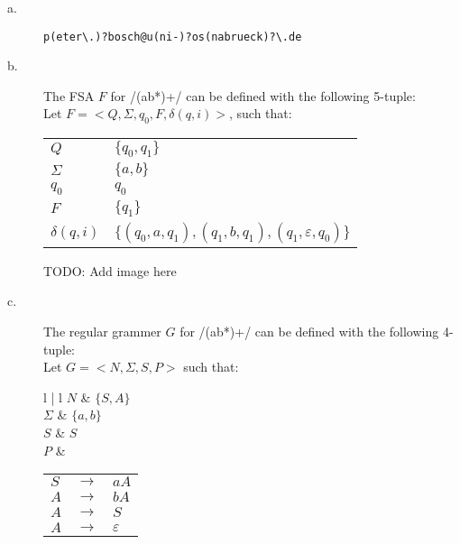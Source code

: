 \documentclass[11pt]{article}
\begin{document}
\begin{solution}
\begin{description}
	\item[a.] \begin{verbatim}p(eter\.)?bosch@u(ni-)?os(nabrueck)?\.de\end{verbatim}
	\item[b.] The FSA $F$ for /(ab*)+/ can be defined with the following 5-tuple:\\
	Let $F = <Q, \Sigma, q_{0}, F, \delta(q, i)>$, such that:

	\begin{tabular}{l | l}
		$Q$ & $\{ q_{0}, q_{1}\}$ \\
		$\Sigma$ & $\{a, b\}$ \\
		$q_{0}$ & $q_{0}$ \\
		$F$ & $\{ q_{1} \}$ \\
		$\delta(q, i)$ &  $\{ (q_{0},a,q_{1}), (q_{1}, b, q_{1}), (q_{1}, \varepsilon, q_{0}) \}$
	\end{tabular}

	TODO: Add image here
	\item[c.] The regular grammer $G$ for /(ab*)+/ can be defined with the following 4-tuple: \\
	Let $G = <N, \Sigma, S, P>$ such that:

	\begin{tabular}{l | l}
		$N$ & $\{ S, A\}$ \\
		$\Sigma$ & $\{a, b\}$ \\
		$S$ & $S$ \\
		$P$ & 
		\begin{tabular}{| l c l |} \hline 
			$S$ & $\rightarrow$ & $aA$ \\ 
			$A$ & $\rightarrow$ & $bA$ \\ 
			$A$ & $\rightarrow$ & $S$  \\
			$A$ & $\rightarrow$ & $\varepsilon$ \\
			\hline
		\end{tabular}
	\end{tabular}

\end{description}

\end{solution}

\vspace*{0.5cm} %
\end{document}
